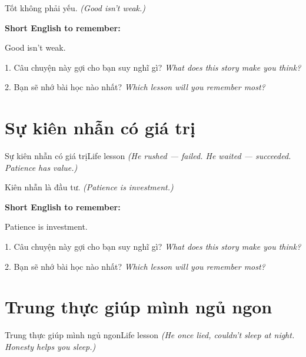 \begin{baihoc}
Tốt không phải yếu.
\textit{(Good isn't weak.)}
\end{baihoc}

\begin{ghinhoanh}
\textbf{Short English to remember:}

Good isn't weak.

\end{ghinhoanh}

\begin{tuhocnhanh}
1. Câu chuyện này gợi cho bạn suy nghĩ gì? \textit{What does this story make you think?}

2. Bạn sẽ nhớ bài học nào nhất? \textit{Which lesson will you remember most?}
\end{tuhocnhanh}
\ngancach


\section{Sự kiên nhẫn có giá trị}
\begin{truyen}{Sự kiên nhẫn có giá trị}{Life lesson}
\textit{(He rushed — failed. He waited — succeeded. Patience has value.)}
\end{truyen}

\begin{baihoc}
Kiên nhẫn là đầu tư.
\textit{(Patience is investment.)}
\end{baihoc}

\begin{ghinhoanh}
\textbf{Short English to remember:}

Patience is investment.

\end{ghinhoanh}

\begin{tuhocnhanh}
1. Câu chuyện này gợi cho bạn suy nghĩ gì? \textit{What does this story make you think?}

2. Bạn sẽ nhớ bài học nào nhất? \textit{Which lesson will you remember most?}
\end{tuhocnhanh}
\ngancach


\section{Trung thực giúp mình ngủ ngon}
\begin{truyen}{Trung thực giúp mình ngủ ngon}{Life lesson}
\textit{(He once lied, couldn't sleep at night. Honesty helps you sleep.)}
\end{truyen}

